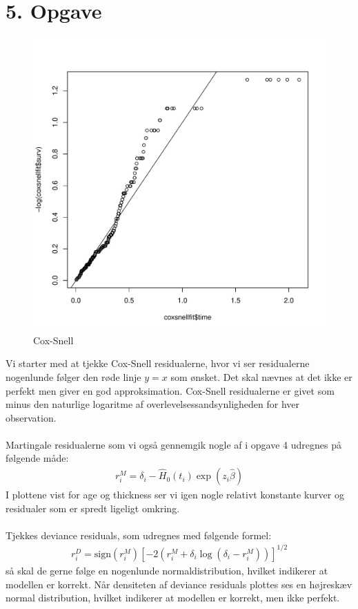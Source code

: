 \chapter{5. Opgave}
\begin{figure}[h]
    \centering
    \includegraphics[width=0.5\linewidth]{Basses_kode/Billeder_duration/Cox_Snell_residualer.pdf}
    \caption{Cox-Snell}
    \label{fig:enter-label}
\end{figure}
Vi starter med at tjekke Cox-Snell residualerne, hvor vi ser residualerne nogenlunde følger den røde linje $y=x$ som ønsket. Det skal nævnes at det ikke er perfekt men giver en god approksimation. Cox-Snell residualerne er givet som minus den naturlige logaritme af overlevelsessandsynligheden for hver observation.\\\\
Martingale residualerne som vi også gennemgik nogle af i opgave 4 udregnes på følgende måde:
\begin{align*}
    r_i^M = \delta_i - \hat{H}_0(t_i) \exp(z_i \hat{\beta})
\end{align*}
I plottene vist for age og thickness ser vi igen nogle relativt konstante kurver og residualer som er spredt ligeligt omkring.\\\\

\noindent Tjekkes deviance residuals, som udregnes med følgende formel: 
\begin{align}
r_i^D = \text{sign}(r_i^M) \left[ -2 \left( r_i^M + \delta_i \log(\delta_i - r_i^M) \right) \right]^{1/2}
\end{align} 
så skal de gerne følge en nogenlunde normaldistribution, hvilket indikerer at modellen er korrekt. Når densiteten af deviance residuals plottes ses en højreskæv normal distribution, hvilket indikerer at modellen er korrekt, men ikke perfekt.\\\\

